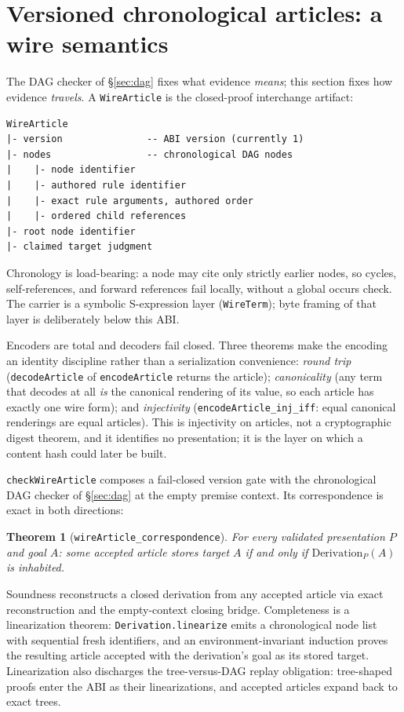 \documentclass[]{article}
\newtheorem{theorem}{Theorem}
\theoremstyle{remark}
\newcommand{\code}[1]{\texttt{#1}}
\begin{document}
\section{Versioned chronological articles: a wire semantics}
\label{sec:wire}

The DAG checker of \S\ref{sec:dag} fixes what evidence \emph{means}; this
section fixes how evidence \emph{travels}.  A \code{WireArticle} is the
closed-proof interchange artifact:

\begin{lstlisting}
WireArticle
|- version               -- ABI version (currently 1)
|- nodes                 -- chronological DAG nodes
|    |- node identifier
|    |- authored rule identifier
|    |- exact rule arguments, authored order
|    |- ordered child references
|- root node identifier
|- claimed target judgment
\end{lstlisting}

Chronology is load-bearing: a node may cite only strictly earlier nodes, so
cycles, self-references, and forward references fail locally, without a
global occurs check.  The carrier is a symbolic S-expression layer
(\code{WireTerm}); byte framing of that layer is deliberately below this
ABI.

Encoders are total and decoders fail closed.  Three theorems make the
encoding an identity discipline rather than a serialization convenience:
\emph{round trip} (\code{decodeArticle} of \code{encodeArticle} returns the
article); \emph{canonicality} (any term that decodes at all \emph{is} the
canonical rendering of its value, so each article has exactly one wire
form); and \emph{injectivity} (\code{encodeArticle\_inj\_iff}: equal canonical
renderings are equal articles).  This is injectivity on articles, not a
cryptographic digest theorem, and it identifies no presentation; it is the
layer on which a content hash could later be built.

\code{checkWireArticle} composes a fail-closed version gate with the
chronological DAG checker of \S\ref{sec:dag} at the empty premise context.
Its correspondence is exact in both directions:

\begin{theorem}[\code{wireArticle\_correspondence}]
For every validated presentation $P$ and goal $A$: some accepted article
stores target $A$ if and only if $\mathrm{Derivation}_P(A)$ is inhabited.
\end{theorem}

Soundness reconstructs a closed derivation from any accepted article via
exact reconstruction and the empty-context closing bridge.  Completeness is
a linearization theorem: \code{Derivation.linearize} emits a chronological
node list with sequential fresh identifiers, and an environment-invariant
induction proves the resulting article accepted with the derivation's goal
as its stored target.  Linearization also discharges the tree-versus-DAG
replay obligation: tree-shaped proofs enter the ABI as their
linearizations, and accepted articles expand back to exact trees.
\end{document}
